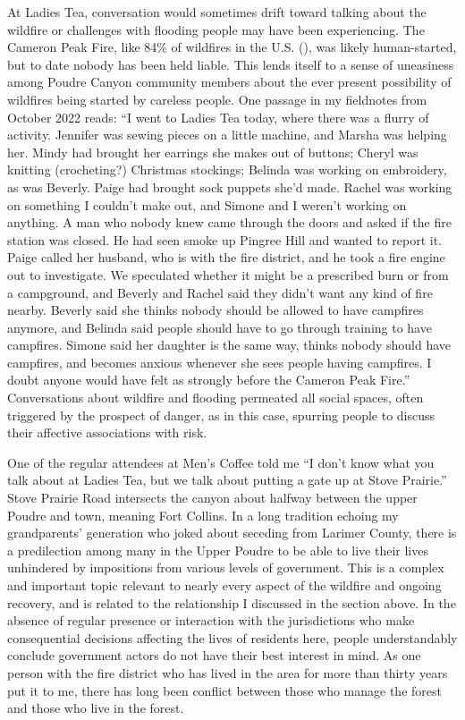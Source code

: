 \documentclass[
]{article}
\begin{document}
At Ladies Tea, conversation would sometimes drift toward talking about the wildfire or challenges with flooding people may have been experiencing. The Cameron Peak Fire, like 84\% of wildfires in the U.S. (), was likely human-started, but to date nobody has been held liable. This lends itself to a sense of uneasiness among Poudre Canyon community members about the ever present possibility of wildfires being started by careless people. One passage in my fieldnotes from October 2022 reads: ``I went to Ladies Tea today, where there was a flurry of activity. Jennifer was sewing pieces on a little machine, and Marsha was helping her. Mindy had brought her earrings she makes out of buttons; Cheryl was knitting (crocheting?) Christmas stockings; Belinda was working on embroidery, as was Beverly. Paige had brought sock puppets she'd made. Rachel was working on something I couldn't make out, and Simone and I weren't working on anything. A man who nobody knew came through the doors and asked if the fire station was closed. He had seen smoke up Pingree Hill and wanted to report it. Paige called her husband, who is with the fire district, and he took a fire engine out to investigate. We speculated whether it might be a prescribed burn or from a campground, and Beverly and Rachel said they didn't want any kind of fire nearby. Beverly said she thinks nobody should be allowed to have campfires anymore, and Belinda said people should have to go through training to have campfires. Simone said her daughter is the same way, thinks nobody should have campfires, and becomes anxious whenever she sees people having campfires. I doubt anyone would have felt as strongly before the Cameron Peak Fire.'' Conversations about wildfire and flooding permeated all social spaces, often triggered by the prospect of danger, as in this case, spurring people to discuss their affective associations with risk.

One of the regular attendees at Men's Coffee told me ``I don't know what you talk about at Ladies Tea, but we talk about putting a gate up at Stove Prairie.'' Stove Prairie Road intersects the canyon about halfway between the upper Poudre and town, meaning Fort Collins. In a long tradition echoing my grandparents' generation who joked about seceding from Larimer County, there is a predilection among many in the Upper Poudre to be able to live their lives unhindered by impositions from various levels of government. This is a complex and important topic relevant to nearly every aspect of the wildfire and ongoing recovery, and is related to the relationship I discussed in the section above. In the absence of regular presence or interaction with the jurisdictions who make consequential decisions affecting the lives of residents here, people understandably conclude government actors do not have their best interest in mind. As one person with the fire district who has lived in the area for more than thirty years put it to me, there has long been conflict between those who manage the forest and those who live in the forest.
\end{document}

